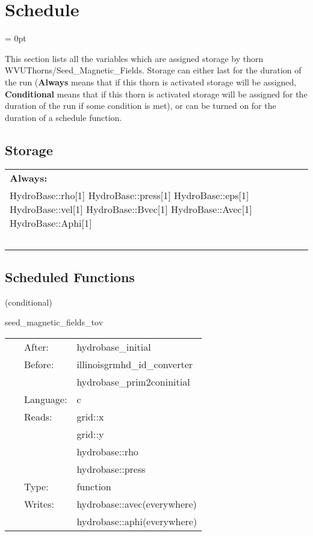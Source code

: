 
\section{Schedule} 


\parskip = 0pt


\noindent This section lists all the variables which are assigned storage by thorn WVUThorns/Seed\_Magnetic\_Fields.  Storage can either last for the duration of the run ({\bf Always} means that if this thorn is activated storage will be assigned, {\bf Conditional} means that if this thorn is activated storage will be assigned for the duration of the run if some condition is met), or can be turned on for the duration of a schedule function.


\subsection*{Storage}

\hspace{5mm}

 \begin{tabular*}{160mm}{ll} 

{\bf Always:}&  ~ \\ 
 HydroBase::rho[1] HydroBase::press[1] HydroBase::eps[1] HydroBase::vel[1] HydroBase::Bvec[1] HydroBase::Avec[1] HydroBase::Aphi[1] & ~\\ 
~ & ~\\ 
\end{tabular*} 


\subsection*{Scheduled Functions}
\vspace{5mm}

   (conditional) 

\hspace{5mm} seed\_magnetic\_fields\_tov 

\hspace{5mm}{\it set up tov seed magnetic fields. } 


\hspace{5mm}

 \begin{tabular*}{160mm}{cll} 
~ & After:  & hydrobase\_initial \\ 
~ & Before:  & illinoisgrmhd\_id\_converter \\ 
~& ~ &hydrobase\_prim2coninitial\\ 
~ & Language:  & c \\ 
~ & Reads:  & grid::x \\ 
~& ~ &grid::y\\ 
~& ~ &hydrobase::rho\\ 
~& ~ &hydrobase::press\\ 
~ & Type:  & function \\ 
~ & Writes:  & hydrobase::avec(everywhere) \\ 
~& ~ &hydrobase::aphi(everywhere)\\ 
\end{tabular*} 


